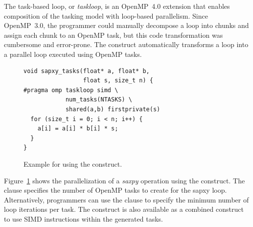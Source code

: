 
\label{sec:Taskloop}

The task-based loop, or \emph{taskloop}, is an OpenMP~4.0 extension that enables composition of the tasking model with loop-based parallelism.
Since OpenMP~3.0, the programmer could manually decompose a loop into chunks and assign each chunk to an OpenMP task, but this code transformation was cumbersome and error-prone.
The  construct automatically transforms a loop into a parallel loop executed using OpenMP tasks.

\begin{figure}
\begin{verbatim}
void sapxy_tasks(float* a, float* b,
                 float s, size_t n) {
#pragma omp taskloop simd \
            num_tasks(NTASKS) \
            shared(a,b) firstprivate(s)
  for (size_t i = 0; i < n; i++) {
    a[i] = a[i] * b[i] * s;
  }
}
\end{verbatim}
\caption{Example for using the  construct.\label{fig:TaskloopExample}}
\end{figure}

Figure~\ref{fig:TaskloopExample} shows the parallelization of a \emph{saxpy} operation using the  construct.
The  clause specifies the number of OpenMP tasks to create for the sapxy loop.
Alternatively, programmers can use the \code{grainsize} clause to specify the minimum number of loop iterations per task.
The \code{taskloop} construct is also available as a combined construct to use SIMD instructions within the generated tasks.
